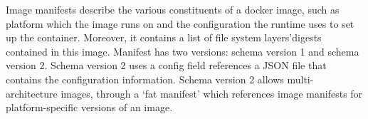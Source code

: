 

%
%
%
%
%



%
%
Image manifests describe the various constituents of a docker image, such as platform
which the image runs on and the configuration the runtime uses to set up the
container.
%
Moreover, it contains a list of file system layers'digests contained in this image.
%
Manifest has two versions: schema version 1 and schema version 2.
%
Schema version 2 uses a config field references a JSON file that contains the
configuration information.
%
Schema version 2 allows multi-architecture images, through a `fat manifest' which
references image manifests for platform-specific versions of an image.





